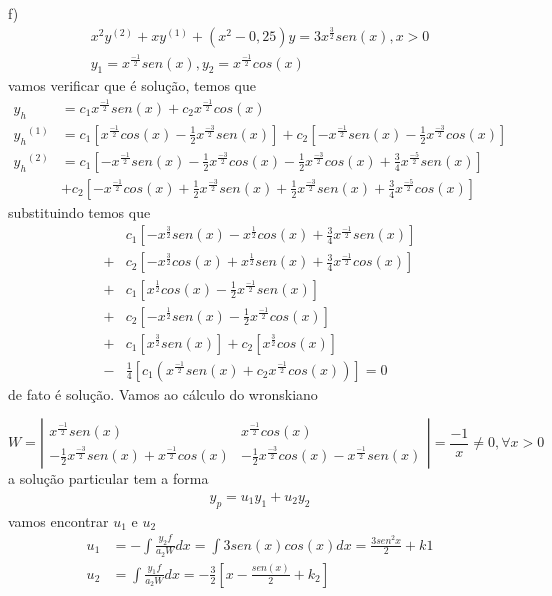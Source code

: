 \documentclass[a4paper,12pt]{article}
\begin{document}
f)
\begin{align*}
	x^{2}y^{(2)} + xy^{(1)} + (x^{2} - 0,25)y = 3x^{\frac{3}{2}}sen(x), x > 0 \\
	y_1 = x^{\frac{-1}{2}} sen(x), y_2 = x^{\frac{-1}{2}} cos(x)
\end{align*}
vamos verificar que \'e solu\c c\~ao, temos que 
\begin{align*}
	y_h &= c_1 x^{\frac{-1}{2}} sen(x) + c_2  x^{\frac{-1}{2}} cos(x)\\
	{y_h}^{(1)} &= c_1 [x^{\frac{-1}{2}} cos(x) -\frac{1}{2} x^{\frac{-3}{2}} sen(x)] + c_2
	[-x^{\frac{-1}{2}} sen(x) -\frac{1}{2}x^{\frac{-3}{2}} cos(x) ] \\
	{y_h}^{(2)} &= c_1[ -x^{\frac{-1}{2}} sen(x) -\frac{1}{2} x^{\frac{-3}{2}} cos(x) - \frac{1}{2}
	x^{\frac{-3}{2}} cos(x) + \frac{3}{4} x^{\frac{-5}{2}} sen(x)] \\
	&+ c_2 [-x^{\frac{-1}{2}}cos(x) + \frac{1}{2}x^{\frac{-3}{2}} sen(x) + \frac{1}{2} x^{\frac{-3}{2}} sen(x) +
	\frac{3}{4} x^{\frac{-5}{2}} cos(x)]
\end{align*}
substituindo temos que 
\begin{align*}
	&c_1[ -x^{\frac{3}{2}} sen(x) -x^{\frac{1}{2}} cos(x) + \frac{3}{4} x^{\frac{-1}{2}} sen(x)] \\
	+& c_2[ -x^{\frac{3}{2}}cos(x) + x^{\frac{1}{2}} sen(x) + \frac{3}{4} x^{\frac{-1}{2}} cos(x)] \\
	+& c_1 [ x^{\frac{1}{2}} cos(x) - \frac{1}{2}x^{\frac{-1}{2}}sen(x)] \\
	+& c_2[ -x^{\frac{1}{2}} sen(x) -\frac{1}{2}x^{\frac{-1}{2}}cos(x)] \\
	+&c_1 [ x^{\frac{3}{2}} sen(x)] + c_2 [ x^{\frac{3}{2}}cos(x)] \\
	-&\frac{1}{4} [c_1(x^{\frac{-1}{2}}sen(x) + c_2 x^{\frac{-1}{2}}cos(x))] = 0
\end{align*}
de fato \'e solu\c c\~ao. Vamos ao c\'alculo do wronskiano

\[ W = \left |
	\begin{array}{cc}	
		x^{\frac{-1}{2}}sen(x)  &  x^{ \frac{-1}{2}} cos(x) \\
		-\frac{1}{2}x^{\frac{-3}{2}} sen(x) + x^{\frac{-1}{2}}cos(x) & -\frac{1}{2}x^{\frac{-3}{2}} cos(x)
		-x^{\frac{-1}{2}}sen(x) 	
	\end{array}
	\right | =\frac{-1}{x} \neq 0, \forall x > 0
\]
a solu\c c\~ao particular tem a forma 
\begin{align*}
	y_p = u_1 y_1 + u_2 y_2 
\end{align*}
vamos encontrar $u_1$ e $u_2$
\begin{align*}
	u_1 &= -\int \frac{y_2 f}{a_2 W}dx = \int 3 sen(x) cos(x) dx = \frac{3sen^{2}x}{2} + k1 \\
	u_2 &= \int \frac{y_1 f}{a_2 W}dx = -\frac{3}{2}\left [ x - \frac{sen(x)}{2}  + k_2 \right ] 
\end{align*}
\end{document}
